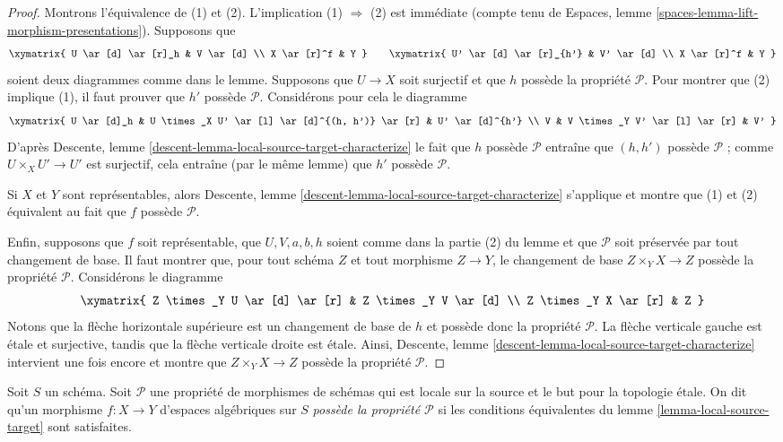 \begin{proof}
Montrons l'équivalence de (1) et (2).
L'implication (1) $\Rightarrow$ (2) est immédiate (compte tenu de
Espaces, lemme \ref{spaces-lemma-lift-morphism-presentations}).
Supposons que
$$
\xymatrix{
U \ar[d] \ar[r]_h & V \ar[d] \\
X \ar[r]^f & Y
}
\quad\quad
\xymatrix{
U' \ar[d] \ar[r]_{h'} & V' \ar[d] \\
X \ar[r]^f & Y
}
$$
soient deux diagrammes comme dans le lemme. Supposons que $U \to X$ soit
surjectif et que $h$ possède la propriété $\mathcal{P}$. Pour montrer que (2)
implique (1), il faut prouver que $h'$ possède $\mathcal{P}$. Considérons
pour cela le diagramme
$$
\xymatrix{
U \ar[d]_h &
U \times_X U' \ar[l] \ar[d]^{(h, h')} \ar[r] &
U' \ar[d]^{h'} \\
V &
V \times_Y V' \ar[l] \ar[r] &
V'
}
$$
D'après
Descente, lemme \ref{descent-lemma-local-source-target-characterize}
le fait que $h$ possède $\mathcal{P}$ entraîne que $(h, h')$ possède $\mathcal{P}$ ;
comme $U \times_X U' \to U'$ est surjectif, cela entraîne (par le même
lemme) que $h'$ possède $\mathcal{P}$.

\medskip\noindent
Si $X$ et $Y$ sont représentables, alors
Descente, lemme \ref{descent-lemma-local-source-target-characterize}
s'applique et montre que (1) et (2) équivalent au fait que $f$ possède
$\mathcal{P}$.

\medskip\noindent
Enfin, supposons que $f$ soit représentable, que $U, V, a, b, h$ soient
comme dans la partie (2) du lemme et que $\mathcal{P}$ soit préservée par
tout changement de base. Il faut montrer que, pour tout schéma
$Z$ et tout morphisme $Z \to Y$, le changement de base $Z \times_Y X \to Z$
possède la propriété $\mathcal{P}$. Considérons le diagramme
$$
\xymatrix{
Z \times_Y U \ar[d] \ar[r] &
Z \times_Y V \ar[d] \\
Z \times_Y X \ar[r] &
Z
}
$$
Notons que la flèche horizontale supérieure est un changement de base de $h$
et possède donc la propriété $\mathcal{P}$. La flèche verticale gauche est étale
et surjective, tandis que la flèche verticale droite est étale. Ainsi,
Descente, lemme \ref{descent-lemma-local-source-target-characterize}
intervient une fois encore et montre que $Z \times_Y X \to Z$
possède la propriété $\mathcal{P}$.
\end{proof}

\begin{definition}
\label{definition-P}
Soit $S$ un schéma.
Soit $\mathcal{P}$ une propriété de morphismes de schémas
qui est locale sur la source et le but pour la topologie étale.
On dit qu'un morphisme $f : X \to Y$ d'espaces algébriques sur $S$
{\it possède la propriété $\mathcal{P}$} si les conditions équivalentes du
lemme \ref{lemma-local-source-target}
sont satisfaites.
\end{definition}

